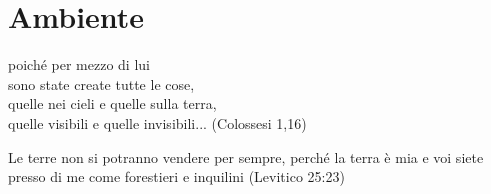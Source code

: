 \documentclass[12pt,a4paper,twoside,openany]{book}
\begin{document}
\pagebreak

\section{Ambiente}

\label{ambiente}
\begin{changemargin}{0.3cm}{0.3cm}\begin{enfasi}{
poiché per mezzo di lui\\
sono state create tutte le cose,\\
quelle nei cieli e quelle sulla terra,\\
quelle visibili e quelle invisibili... (Colossesi 1,16)\\\medskip

Le terre non si potranno vendere per sempre, perché la terra è mia e voi siete presso di me come forestieri e inquilini (Levitico 25:23)
}\end{enfasi}\end{changemargin}\medskip
\end{document}
